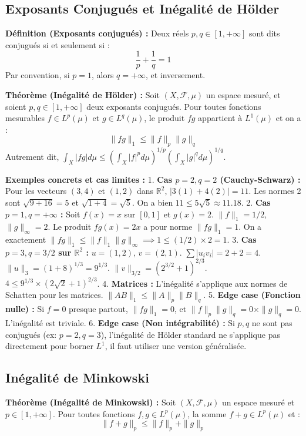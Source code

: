 \documentclass[11pt,a4paper]{article}
\begin{document}
\subsection*{Exposants Conjugués et Inégalité de Hölder}

\textbf{Définition (Exposants conjugués) :} Deux réels $p, q \in [1, +\infty]$ sont dits conjugués si et seulement si :
$$\frac{1}{p} + \frac{1}{q} = 1$$
Par convention, si $p=1$, alors $q=+\infty$, et inversement.

\textbf{Théorème (Inégalité de Hölder) :} Soit $(X, \mathcal{F}, \mu)$ un espace mesuré, et soient $p, q \in [1, +\infty]$ deux exposants conjugués. Pour toutes fonctions mesurables $f \in L^p(\mu)$ et $g \in L^q(\mu)$, le produit $fg$ appartient à $L^1(\mu)$ et on a :
$$\|fg\|_1 \le \|f\|_p \|g\|_q$$
Autrement dit, $\int_X |fg| d\mu \le \left( \int_X |f|^p d\mu \right)^{1/p} \left( \int_X |g|^q d\mu \right)^{1/q}$.

\textbf{Exemples concrets et cas limites :}
1. \textbf{Cas $p=2, q=2$ (Cauchy-Schwarz) :} Pour les vecteurs $(3, 4)$ et $(1, 2)$ dans $\mathbb{R}^2$, $|3(1) + 4(2)| = 11$. Les normes 2 sont $\sqrt{9+16}=5$ et $\sqrt{1+4}=\sqrt{5}$. On a bien $11 \le 5\sqrt{5} \approx 11.18$.
2. \textbf{Cas $p=1, q=+\infty$ :} Soit $f(x)=x$ sur $[0,1]$ et $g(x)=2$. $\|f\|_1 = 1/2$, $\|g\|_\infty = 2$. Le produit $fg(x)=2x$ a pour norme $\|fg\|_1 = 1$. On a exactement $\|fg\|_1 \le \|f\|_1 \|g\|_\infty \implies 1 \le (1/2) \times 2 = 1$.
3. \textbf{Cas $p=3, q=3/2$ sur $\mathbb{R}^2$ :} $u=(1, 2)$, $v=(2, 1)$. $\sum |u_i v_i| = 2 + 2 = 4$. $\|u\|_3 = (1+8)^{1/3} = 9^{1/3}$. $\|v\|_{3/2} = (2^{3/2} + 1)^{2/3}$. $4 \le 9^{1/3} \times (2\sqrt{2}+1)^{2/3}$.
4. \textbf{Matrices :} L'inégalité s'applique aux normes de Schatten pour les matrices. $\|AB\|_1 \le \|A\|_p \|B\|_q$.
5. \textbf{Edge case (Fonction nulle) :} Si $f=0$ presque partout, $\|fg\|_1 = 0$, et $\|f\|_p \|g\|_q = 0 \times \|g\|_q = 0$. L'inégalité est triviale.
6. \textbf{Edge case (Non intégrabilité) :} Si $p, q$ ne sont pas conjugués (ex: $p=2, q=3$), l'inégalité de Hölder standard ne s'applique pas directement pour borner $L^1$, il faut utiliser une version généralisée.

\subsection*{Inégalité de Minkowski}

\textbf{Théorème (Inégalité de Minkowski) :} Soit $(X, \mathcal{F}, \mu)$ un espace mesuré et $p \in [1, +\infty]$. Pour toutes fonctions $f, g \in L^p(\mu)$, la somme $f+g \in L^p(\mu)$ et :
$$\|f+g\|_p \le \|f\|_p + \|g\|_p$$
\end{document}
